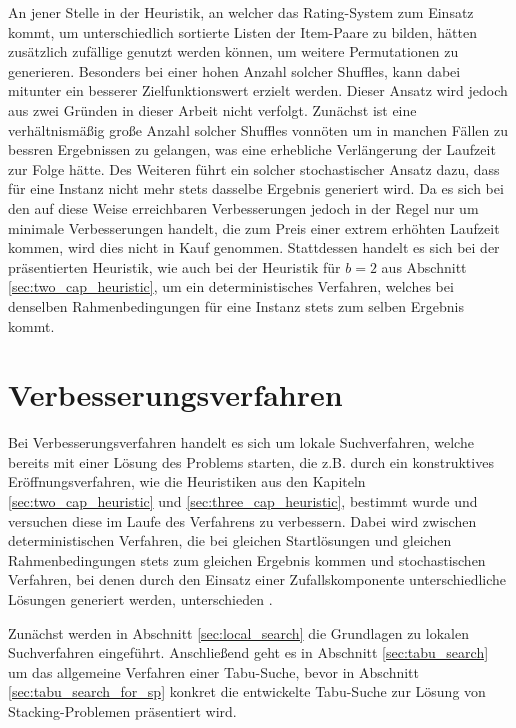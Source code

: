 
An jener Stelle in der Heuristik, an welcher das Rating-System zum Einsatz kommt, um unterschiedlich sortierte
Listen der Item-Paare zu bilden, hätten zusätzlich zufällige  genutzt werden können,
um weitere Permutationen zu generieren. Besonders bei einer hohen Anzahl solcher Shuffles,
kann dabei mitunter ein besserer Zielfunktionswert erzielt werden. Dieser Ansatz wird jedoch aus zwei Gründen in
dieser Arbeit nicht verfolgt. Zunächst ist eine verhältnismäßig große Anzahl solcher Shuffles vonnöten um in
manchen Fällen zu bessren Ergebnissen zu gelangen, was eine erhebliche Verlängerung der Laufzeit zur Folge hätte.
Des Weiteren führt ein solcher stochastischer Ansatz dazu, dass für eine Instanz nicht mehr stets dasselbe Ergebnis
generiert wird. Da es sich bei den auf diese Weise erreichbaren Verbesserungen jedoch in der Regel nur um minimale
Verbesserungen handelt, die zum Preis einer extrem erhöhten Laufzeit kommen, wird dies nicht in Kauf genommen.
Stattdessen handelt es sich bei der präsentierten Heuristik, wie auch bei der Heuristik für $b = 2$ aus Abschnitt
\ref{sec:two_cap_heuristic}, um ein deterministisches Verfahren, welches bei denselben Rahmenbedingungen für eine Instanz
stets zum selben Ergebnis kommt.

\pagebreak

\section{Verbesserungsverfahren}
\label{sec:post_optimization}

Bei Verbesserungsverfahren handelt es sich um lokale Suchverfahren, welche bereits mit einer Lösung des Problems starten,
die z.B. durch ein konstruktives Eröffnungsverfahren, wie die Heuristiken aus den Kapiteln \ref{sec:two_cap_heuristic}
und \ref{sec:three_cap_heuristic}, bestimmt wurde und versuchen diese im Laufe des Verfahrens zu verbessern.
Dabei wird zwischen deterministischen Verfahren, die bei gleichen Startlösungen und gleichen Rahmenbedingungen stets zum gleichen Ergebnis kommen und stochastischen Verfahren, bei denen durch den Einsatz einer Zufallskomponente unterschiedliche Lösungen generiert werden, unterschieden \cite{Knust2017}.

Zunächst werden in Abschnitt \ref{sec:local_search} die Grundlagen zu lokalen Suchverfahren eingeführt.
Anschließend geht es in Abschnitt \ref{sec:tabu_search} um das allgemeine Verfahren einer Tabu-Suche,
bevor in Abschnitt \ref{sec:tabu_search_for_sp} konkret die entwickelte Tabu-Suche zur Lösung von Stacking-Problemen
präsentiert wird.

